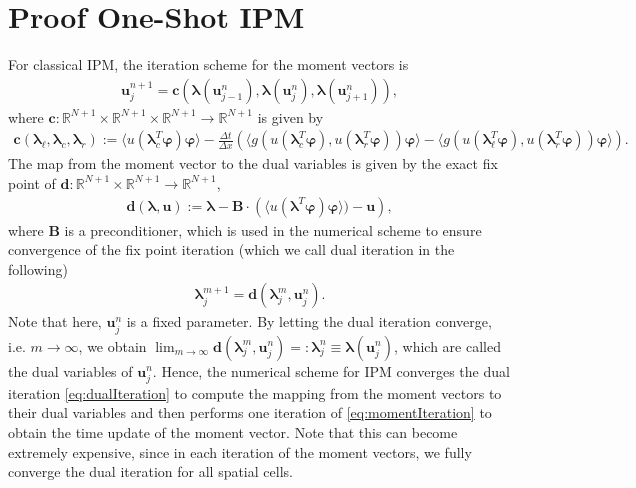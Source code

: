 \documentclass[10pt, a4paper, titlepage, bibliography=totocnumbered]{article}
\begin{document}
\section*{Proof One-Shot IPM}
For classical IPM, the iteration scheme for the moment vectors is
\begin{align}\label{eq:momentIteration}
\bm{u}_j^{n+1} = \bm{c}\left(\bm{\lambda}(\bm{u}_{j-1}^n),\bm{\lambda}(\bm{u}_{j}^n),\bm{\lambda}(\bm{u}_{j+1}^n)\right),
\end{align}
where $\bm{c}:\mathbb{R}^{N+1}\times\mathbb{R}^{N+1}\times\mathbb{R}^{N+1}\to\mathbb{R}^{N+1}$ is given by
\begin{align*}
\bm{c}\left(\bm{\lambda}_{\ell},\bm{\lambda}_c,\bm{\lambda}_r\right):= \langle u(\bm{\lambda}_c^T\bm{\varphi})\bm{\varphi}\rangle - \frac{\Delta t}{\Delta x}\left(\langle g(u(\bm{\lambda}_c^T\bm{\varphi}),u(\bm{\lambda}_r^T\bm{\varphi}))\bm{\varphi}\rangle-\langle g(u(\bm{\lambda}_{\ell}^T\bm{\varphi}),u(\bm{\lambda}_r^T\bm{\varphi}))\bm{\varphi}\rangle\right).
\end{align*}
The map from the moment vector to the dual variables is given by the exact fix point of $\bm{d}:\mathbb{R}^{N+1}\times\mathbb{R}^{N+1}\to\mathbb{R}^{N+1}$,
\begin{align*}
\bm{d}(\bm{\lambda},\bm{u}):= \bm{\lambda}-\bm{B}\cdot \left(\langle u(\bm{\lambda}^T\bm{\varphi})\bm{\varphi}\rangle)-\bm{u}\right),
\end{align*}
where $\bm{B}$ is a preconditioner, which is used in the numerical scheme to ensure convergence of the fix point iteration (which we call dual iteration in the following)
\begin{align}\label{eq:dualIteration}
\bm{\lambda}_j^{m+1} = \bm{d}(\bm{\lambda}_j^m,\bm{u}_j^{n}).
\end{align}
Note that here, $\bm{u}_j^{n}$ is a fixed parameter. By letting the dual iteration converge, i.e. $m\rightarrow\infty$, we obtain $\lim_{m\rightarrow\infty}\bm{d}(\bm{\lambda}_j^m,\bm{u}_j^{n}) =:\bm{\lambda}_j^{n} \equiv \bm\lambda(\bm{u}_j^{n})$, which are called the dual variables of $\bm{u}_j^{n}$. Hence, the numerical scheme for IPM converges the dual iteration \eqref{eq:dualIteration} to compute the mapping from the moment vectors to their dual variables and then performs one iteration of \eqref{eq:momentIteration} to obtain the time update of the moment vector. Note that this can become extremely expensive, since in each iteration of the moment vectors, we fully converge the dual iteration for all spatial cells.
\end{document}
